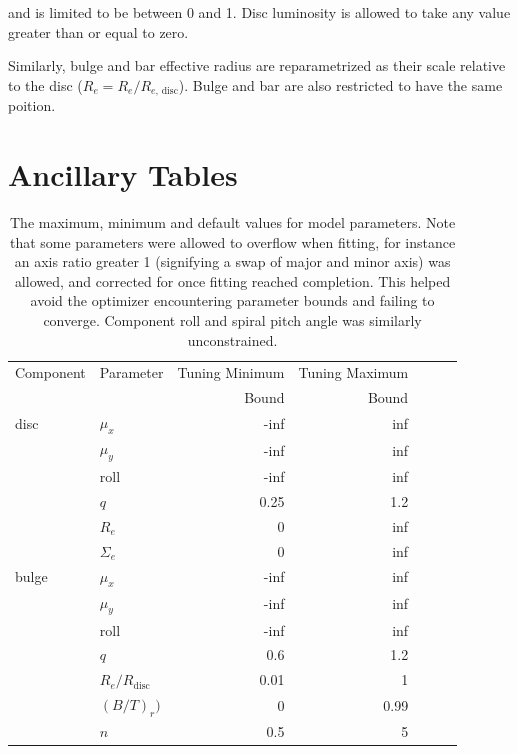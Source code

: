 \documentclass[../main.tex]{subfiles}
\begin{document}
and is limited to be between 0 and 1. Disc luminosity is allowed to take any value greater than or equal to zero.

Similarly, bulge and bar effective radius are reparametrized as their scale relative to the disc ($R_e = R_e / R_{e,\,\mathrm{disc}}$). Bulge and bar are also restricted to have the same poition.


\section{Ancillary Tables}
\begin{table}
  \centering
  \caption{The maximum, minimum and default values for model parameters. Note that some parameters were allowed to overflow when fitting, for instance an axis ratio greater 1 (signifying a swap of major and minor axis) was allowed, and corrected for once fitting reached completion. This helped avoid the optimizer encountering parameter bounds and failing to converge. Component roll and spiral pitch angle was similarly unconstrained.}
  \begin{tabular}{l|l|r|r|r|r|r}
\hline
Component & Parameter  & Tuning Minimum & Tuning Maximum \\
          &            &  Bound         & Bound          \\
\hline
disc      & $\mu_x$    & -inf           & inf            \\
          & $\mu_y$    & -inf           & inf            \\
          & roll       & -inf           & inf            \\
          & $q$        & 0.25           & 1.2            \\
          & $R_e$      & 0              & inf            \\
          & $\Sigma_e$ & 0              & inf            \\
bulge     & $\mu_x$    & -inf           & inf            \\
          & $\mu_y$    & -inf           & inf            \\
          & roll       & -inf           & inf            \\
          & $q$        & 0.6            & 1.2            \\
          & $R_e / R_\mathrm{disc}$ & 0.01 & 1           \\
          & $(B/T)_r)$ & 0              & 0.99           \\
          & $n$        & 0.5            & 5              \\

\end{tabular}
\end{table}
\end{document}

